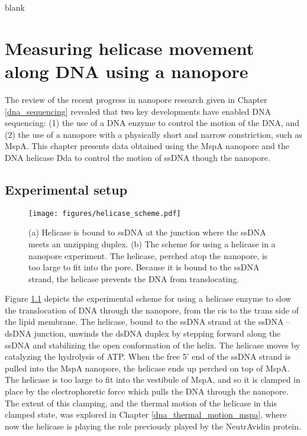 \begin{savequote}[75mm]
blank
\end{savequote}

\chapter{Measuring helicase movement along DNA using a nanopore}
\label{helicase_on_dna}

The review of the recent progress in nanopore research given in Chapter \ref{dna_sequencing} revealed that two key developments have enabled DNA sequencing: (1) the use of a DNA enzyme to control the motion of the DNA, and (2) the use of a nanopore with a physically short and narrow constriction, such as MspA.  This chapter presents data obtained using the MspA nanopore and the DNA helicase Dda to control the motion of ssDNA though the nanopore.

\section{Experimental setup}

\begin{figure}[h]
\begin{centering}
\texttt{[image: figures/helicase\_scheme.pdf]}
\caption[Helicase can control DNA translocation]{(a) Helicase is bound to ssDNA at the junction where the ssDNA meets an unzipping duplex.  (b) The scheme for using a helicase in a nanopore experiment.  The helicase, perched atop the nanopore, is too large to fit into the pore.  Because it is bound to the ssDNA strand, the helicase prevents the DNA from translocating.}
\label{fig:helicase_scheme}
\end{centering}
\end{figure}

Figure \ref{fig:helicase_scheme} depicts the experimental scheme for using a helicase enzyme to slow the translocation of DNA through the nanopore, from the cis to the trans side of the lipid membrane.  The helicase, bound to the ssDNA strand at the ssDNA – dsDNA junction, unwinds the dsDNA duplex by stepping forward along the ssDNA and stabilizing the open conformation of the helix.  The helicase moves by catalyzing the hydrolysis of ATP.  When the free 5’ end of the ssDNA strand is pulled into the MspA nanopore, the helicase ends up perched on top of MspA.  The helicase is too large to fit into the vestibule of MspA, and so it is clamped in place by the electrophoretic force which pulls the DNA through the nanopore.  The extent of this clamping, and the thermal motion of the helicase in this clamped state, was explored in Chapter \ref{dna_thermal_motion_mspa}, where now the helicase is playing the role previously played by the NeutrAvidin protein.

